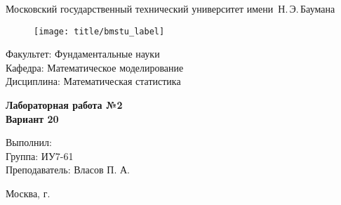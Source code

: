
\thispagestyle{empty}

\begin{center}
    \Large
    Московский государственный технический университет имени~Н.\,Э.\,Баумана
\end{center}

\begin{figure}[h!]
    \begin{center}
        \texttt{[image: title/bmstu\_label]}
    \end{center}
\end{figure}

\hfill\begin{minipage}{0.77\textwidth}
{\large
\noindent
Факультет: Фундаментальные науки\\[2mm]
\noindent
Кафедра:  Математическое моделирование\\[2mm]
\noindent
Дисциплина: Математическая статистика 
\vspace{1.5cm}}
\end{minipage}
\vfill

\begin{center}
    \Large
    \textbf{Лабораторная работа №2 \\Вариант 20}
\end{center}
\vfill

\hfill\begin{minipage}{0.6\textwidth}
    Выполнил: \\
    Группа: ИУ7-61\\
    Преподаватель: Власов П. А.
\end{minipage}
\vfill

\begin{center}
    Москва, \the\year\space г.
\end{center}